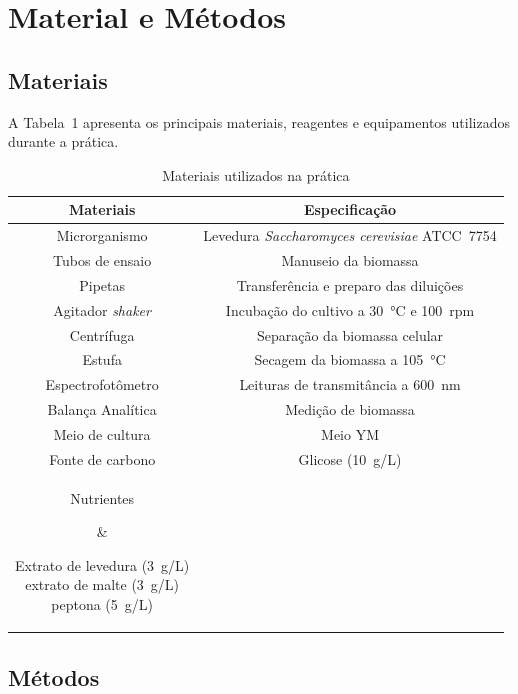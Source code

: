 
\section{Material e Métodos}

\subsection{Materiais}

A Tabela~1 apresenta os principais materiais, reagentes e equipamentos utilizados durante a prática.

\begin{table}[H]
\caption{Materiais utilizados na prática}
\centering
\begin{tabular}{cc}
\toprule
\textbf{Materiais} & \textbf{Especificação} \\
\midrule
Microrganismo & Levedura \textit{Saccharomyces cerevisiae} ATCC~7754 \\
Tubos de ensaio & Manuseio da biomassa \\
Pipetas & Transferência e preparo das diluições \\
Agitador \textit{shaker} & Incubação do cultivo a 30~°C e 100~rpm \\
Centrífuga & Separação da biomassa celular \\
Estufa & Secagem da biomassa a 105~°C \\
Espectrofotômetro & Leituras de transmitância a 600~nm \\
Balança Analítica & Medição de biomassa \\
Meio de cultura & Meio YM \\
Fonte de carbono & Glicose (10~g/L) \\
\parbox[c][1.8cm][c]{2cm}{\centering Nutrientes} & \parbox[c][2cm][c]{6.2cm}{\centering Extrato de levedura (3~g/L) \\ extrato de malte (3~g/L) \\ peptona (5~g/L)} \\
\bottomrule
\end{tabular}
\end{table}

\subsection{Métodos}

